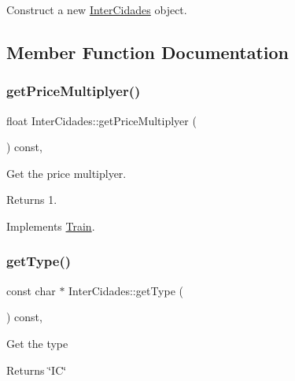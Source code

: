 Construct a new \mbox{\hyperlink{classInterCidades}{Inter\+Cidades}} object. 

\subsection{Member Function Documentation}
\mbox{\label{classInterCidades_ae48f10e5086edea5b9797ae12ab0867f}} 
\subsubsection{\texorpdfstring{get\+Price\+Multiplyer()}{getPriceMultiplyer()}}
{\footnotesize\ttfamily float Inter\+Cidades\+::get\+Price\+Multiplyer (\begin{DoxyParamCaption}{ }\end{DoxyParamCaption}) const\hspace{0.3cm}{\ttfamily [override]}, {\ttfamily [virtual]}}

Get the price multiplyer.

\begin{DoxyReturn}{Returns}
1. 
\end{DoxyReturn}


Implements \mbox{\hyperlink{classTrain_a2f8a45aaa96058a2675422d206221964}{Train}}.

\mbox{\label{classInterCidades_a19eb37a1538d16247a7ba44e4a3c367b}} 
\subsubsection{\texorpdfstring{get\+Type()}{getType()}}
{\footnotesize\ttfamily const char $\ast$ Inter\+Cidades\+::get\+Type (\begin{DoxyParamCaption}{ }\end{DoxyParamCaption}) const\hspace{0.3cm}{\ttfamily [override]}, {\ttfamily [virtual]}}

Get the type \begin{DoxyReturn}{Returns}
\char`\"{}\+I\+C\char`\"{} 
\end{DoxyReturn}


